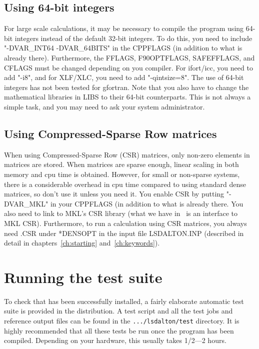 \subsection{Using 64-bit integers}
For large scale calculations, it may be necessary to compile the program using 64-bit integers instead of the default 32-bit integers.
To do this, you need to include "-DVAR\_INT64 -DVAR\_64BITS" in the CPPFLAGS (in addition to what is already there). Furthermore, 
the FFLAGS, F90OPTFLAGS, SAFEFFLAGS, and CFLAGS must be changed depending on you compiler. For ifort/icc, you need to add "-i8",
and for XLF/XLC, you need to add "-qintsize=8". The use of 64-bit integers has not been tested for gfortran. Note that you also have
to change the mathematical libraries in LIBS to their 64-bit counterparts. This is not always a simple task, and you may need to ask your
system administrator. 

\subsection{Using Compressed-Sparse Row matrices}
When using Compressed-Sparse Row (CSR) matrices, only non-zero elements in matrices are stored. 
When matrices are sparse enough, linear scaling in both memory and cpu time is obtained. However, for
small or non-sparse systems, there is a considerable overhead in cpu time compared to 
using standard dense matrices, so don't use it unless you need it. You enable CSR by putting
"-DVAR\_MKL" in your CPPFLAGS (in addition to what is already there. You also need to link
to MKL's CSR library (what we have in \lsdalton\ is an interface to MKL CSR). Furthermore, to run a calculation
using CSR matrices, you always need .CSR under *DENSOPT in the input file LSDALTON.INP (described in detail in
chapters~\ref{ch:starting} and~\ref{ch:keywords}).

\section{Running the {\lsdalton} test suite}\label{sec:testsuite}

To check that {\lsdalton} has been successfully installed, a fairly
elaborate automatic test suite is provided in the distribution. A test
script and all the test jobs and reference output files can be found in
the \verb|.../lsdalton/test| directory. It is highly recommended that all
these tests be run once the program has been compiled. Depending on
your hardware, this usually takes 1/2---2 hours.


